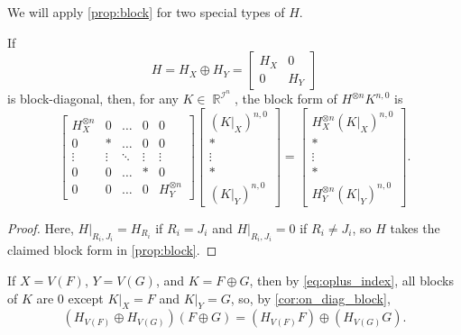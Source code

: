 \documentclass{theoretics}
\DeclareMathOperator{\rr}{\mathbb{R}}
\DeclareMathOperator{\ic}{\mathcal{I}}
\begin{document}
We will apply \autoref{prop:block} for two special types of $H$.
\begin{corollary}
    \label{cor:on_diag_block}
    If 
    \[
        H = H_X \oplus H_Y = \begin{bmatrix} H_X & 0 \\ 0 & H_Y\end{bmatrix}
    \]
    is block-diagonal, then, for any $K \in \rr^{\ic^n}$, 
    the block form of $H^{\otimes n} K^{n,0}$ is
    \[
        \begin{bmatrix} 
            H_X^{\otimes n} & 0 & \ldots & 0 & 0\\
            0 & * & \ldots & 0 & 0\\
            \vdots & \vdots & \ddots & \vdots & \vdots \\
            0 & 0 & \ldots & * & 0\\
            0 & 0 & \ldots & 0 & H_Y^{\otimes n}
        \end{bmatrix}
        \begin{bmatrix} 
            (K|_X)^{n,0} \\ * \\ \vdots \\ * \\ (K|_Y)^{n,0}
        \end{bmatrix} =
        \begin{bmatrix} 
            H_X^{\otimes n}(K|_X)^{n,0} \\ * \\ \vdots \\ * \\ H_Y^{\otimes n}(K|_Y)^{n,0}
        \end{bmatrix}.
    \]
\end{corollary}
\begin{proof}
    Here,
    $H|_{R_i,J_i} = H_{R_i}$ if $R_i = J_i$ and $H|_{R_i,J_i} = 0$ if $R_i\neq J_i$, so $H$ takes the
    claimed block form in \autoref{prop:block}.
\end{proof}
If $X = V(F)$, $Y = V(G)$, and $K = F \oplus G$, then by \eqref{eq:oplus_index},
all blocks of $K$ are 0 except $K|_X = F$ and $K|_Y = G$, so, by \autoref{cor:on_diag_block},
\begin{equation}
    \label{eq:oplus_action}
    (H_{V(F)} \oplus H_{V(G)})(F \oplus G) = (H_{V(F)} F) \oplus (H_{V(G)} G).
\end{equation}
\end{document}
